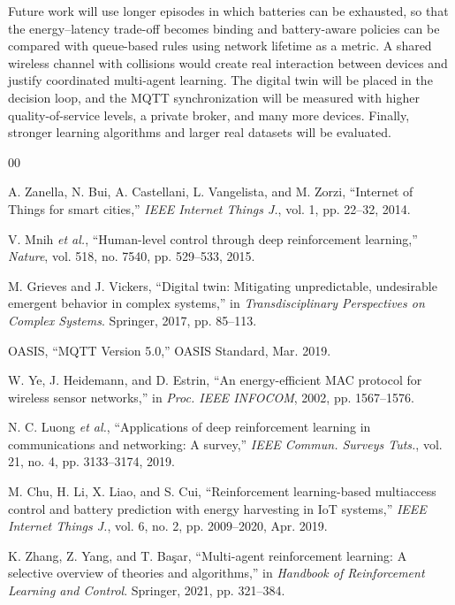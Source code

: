 \documentclass[conference]{IEEEtran}
\begin{document}
Future work will use longer episodes in which batteries can be exhausted, so that the energy--latency trade-off becomes binding and battery-aware policies can be compared with queue-based rules using network lifetime as a metric. A shared wireless channel with collisions would create real interaction between devices and justify coordinated multi-agent learning. The digital twin will be placed in the decision loop, and the MQTT synchronization will be measured with higher quality-of-service levels, a private broker, and many more devices. Finally, stronger learning algorithms and larger real datasets will be evaluated.

\begin{thebibliography}{00}

 A. Zanella, N. Bui, A. Castellani, L. Vangelista, and M. Zorzi, ``Internet of Things for smart cities,'' \emph{IEEE Internet Things J.}, vol. 1, pp. 22--32, 2014.

 V. Mnih \emph{et al.}, ``Human-level control through deep reinforcement learning,'' \emph{Nature}, vol. 518, no. 7540, pp. 529--533, 2015.

 M. Grieves and J. Vickers, ``Digital twin: Mitigating unpredictable, undesirable emergent behavior in complex systems,'' in \emph{Transdisciplinary Perspectives on Complex Systems}. Springer, 2017, pp. 85--113.

 OASIS, ``MQTT Version 5.0,'' OASIS Standard, Mar. 2019.

 W. Ye, J. Heidemann, and D. Estrin, ``An energy-efficient MAC protocol for wireless sensor networks,'' in \emph{Proc. IEEE INFOCOM}, 2002, pp. 1567--1576.

 N. C. Luong \emph{et al.}, ``Applications of deep reinforcement learning in communications and networking: A survey,'' \emph{IEEE Commun. Surveys Tuts.}, vol. 21, no. 4, pp. 3133--3174, 2019.

 M. Chu, H. Li, X. Liao, and S. Cui, ``Reinforcement learning-based multiaccess control and battery prediction with energy harvesting in IoT systems,'' \emph{IEEE Internet Things J.}, vol. 6, no. 2, pp. 2009--2020, Apr. 2019.

 K. Zhang, Z. Yang, and T. Ba\c{s}ar, ``Multi-agent reinforcement learning: A selective overview of theories and algorithms,'' in \emph{Handbook of Reinforcement Learning and Control}. Springer, 2021, pp. 321--384.


\end{thebibliography}
\end{document}
